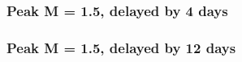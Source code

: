 	\subsubsection{Peak M = 1.5, delayed by 4 days}
		\label{chap:sim_R2_2_1}
	\subsubsection{Peak M = 1.5, delayed by 12 days}
		\label{chap:sim_R2_2_3}
